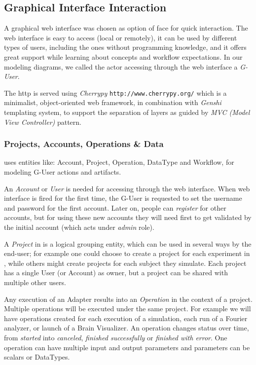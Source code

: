 
\subsection{Graphical Interface Interaction}

A graphical web interface was chosen as option of \TVB face for quick interaction. The web interface is easy to access (local or remotely),
it can be used by different types of users, including the ones without programming knowledge, and it offers great 
support while learning about \TVB concepts and workflow expectations. 
In our modeling diagrams, we called the actor accessing \TVB through the web interface a \emph{G-User}.

The http is served using \emph{Cherrypy} \texttt{http://www.cherrypy.org/} which is a minimalist, object-oriented web framework, 
in combination with \emph{Genshi} templating system, to support the separation of layers as guided by \emph{MVC (Model View Controller)} pattern.

	\subsubsection{Projects, Accounts, Operations \& Data}

\TVB uses entities like: Account, Project, Operation, DataType and Workflow, for modeling G-User actions and artifacts. 

 An \emph{Account} or \emph{User} is needed for accessing  \TVB through the web interface. 
 When \TVB web interface is fired for the first time, the G-User is requested to set the username and password for the first account.
Later on, people can \emph{register} for other accounts, but for using these new accounts they will need first to get validated by the 
initial account (which acts under \emph{admin} role).

A \emph{Project} in \TVB is a logical grouping entity, which  can be used in several ways by the end-user; 
for example one could choose to create a project for each experiment in \TVB, while others might create projects for each subject they simulate.
Each project has a single User (or Account) as owner, but a project can be shared with multiple other users.

Any execution of an Adapter results into an \emph{Operation} in the context of a project. Multiple operations will be executed under the same project.
For example we will have operations created for each execution of a simulation, each run of a Fourier analyzer, or launch of a Brain Visualizer.
An operation changes status over time, from \emph{started} into \emph{canceled}, \emph{finished successfully} or \emph{finished with error}.
One operation can have multiple input and output parameters and parameters can be scalars or DataTypes.

